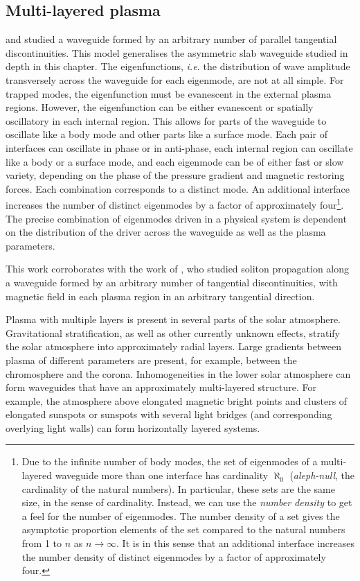 \documentclass[12pt,draft]{../style-files/ociamthesis}
\begin{document}
\subsection{Multi-layered plasma}
\cite{shu_etal18} and \cite{all_etal19} studied a waveguide formed by an arbitrary number of parallel tangential discontinuities. This model generalises the asymmetric slab waveguide studied in depth in this chapter. The eigenfunctions, \textit{i.e.} the distribution of wave amplitude transversely across the waveguide for each eigenmode, are not at all simple. For trapped modes, the eigenfunction must be evanescent in the external plasma regions. However, the eigenfunction can be either evanescent or spatially oscillatory in each internal region. This allows for parts of the waveguide to oscillate like a body mode and other parts like a surface mode. Each pair of interfaces can oscillate in phase or in anti-phase, each internal region can oscillate like a body or a surface mode, and each eigenmode can be of either fast or slow variety, depending on the phase of the pressure gradient and magnetic restoring forces. Each combination corresponds to a distinct mode. An additional interface increases the number of distinct eigenmodes by a factor of approximately four\footnote{Due to the infinite number of body modes, the set of eigenmodes of a multi-layered waveguide more than one interface has cardinality $\aleph_0$ (\textit{aleph-null}, the cardinality of the natural numbers). In particular, these sets are the same size, in the sense of cardinality. Instead, we can use the \textit{number density} to get a feel for the number of eigenmodes. The number density of a set gives the asymptotic proportion elements of the set compared to the natural numbers from 1 to $n$ as $n \to \infty$. It is in this sense that an additional interface increases the number density of distinct eigenmodes by a factor of approximately four.}. The precise combination of eigenmodes driven in a physical system is dependent on the distribution of the driver across the waveguide as well as the plasma parameters.

This work corroborates with the work of \cite{rud92}, who studied soliton propagation along a waveguide formed by an arbitrary number of tangential discontinuities, with magnetic field in each plasma region in an arbitrary tangential direction.

Plasma with multiple layers is present in several parts of the solar atmosphere. Gravitational stratification, as well as other currently unknown effects, stratify the solar atmosphere into approximately radial layers. Large gradients between plasma of different parameters are present, for example, between the chromosphere and the corona. Inhomogeneities in the lower solar atmosphere can form waveguides that have an approximately multi-layered structure. For example, the atmosphere above elongated magnetic bright points and clusters of elongated sunspots or sunspots with several light bridges (and corresponding overlying light walls) can form horizontally layered systems.
\end{document}
